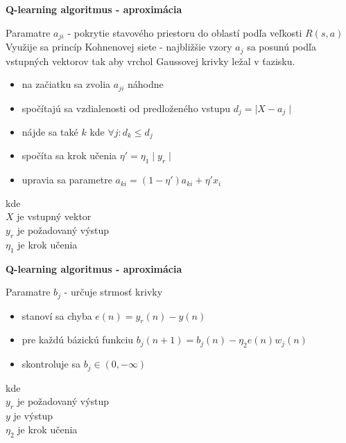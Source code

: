 \documentclass[xcolor=dvipsnames]{beamer}
\begin{document}
\begin{frame}{\bf Q-learning algoritmus - aproximácia}

Paramatre $a_{ji}$ - pokrytie stavového priestoru do oblastí podľa veľkosti $R(s, a)$
Využije sa princíp Kohnenovej siete - najbližšie vzory $a_j$ sa posunú podľa vstupných
vektorov tak aby vrchol Gaussovej krivky ležal v ťazisku.
\\
\begin{itemize}
\item na začiatku sa zvolia $a_{ji}$ náhodne
\item spočítajú sa vzdialenosti od predloženého vstupu $d_j = \mid X - a_{j} \mid$
\item nájde sa také $k$ kde  $\forall{j} : d_k \leq d_j$
\item spočíta sa krok učenia $\eta' = \eta_1 \mid y_r \mid$
\item upravia sa parametre $a_{ki} = (1 - \eta')a_{ki} + \eta' x_{i}$
\end{itemize}

kde \\
$X$ je vstupný vektor \\
$y_r$ je požadovaný výstup \\
$\eta_1$ je krok učenia \\

\end{frame}

\begin{frame}{\bf Q-learning algoritmus - aproximácia}

Paramatre $b_{j}$ - určuje strmosť krivky

\begin{itemize}
\item stanoví sa chyba $e(n) = y_r(n) - y(n)$
\item pre každú bázickú funkciu  $b_j(n+1)= b_j(n) -\eta_2 e(n)w_j(n)$
\item skontroluje sa $b_j \in (0, -\infty)$
\end{itemize}

kde \\
$y_r$ je požadovaný výstup \\
$y$ je výstup\\
$\eta_2$ je krok učenia \\

\end{frame}
\end{document}
